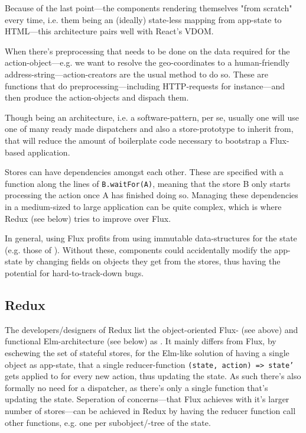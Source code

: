 Because of the last point---the components rendering themselves "from scratch" every time, i.e. them being an (ideally) state-less mapping from app-state to HTML---this architecture pairs well with React's VDOM.

When there's preprocessing that needs to be done on the data required for the action-object---e.g. we want to resolve the geo-coordinates to a human-friendly address-string---action-creators are the usual method to do so. These are functions that do preprocessing---including HTTP-requests for instance---and then produce the action-objects and dispach them. 

Though being an architecture, i.e. a software-pattern,  per se, usually one will use one of many ready made dispatchers and also a store-prototype to inherit from, that will reduce the amount of boilerplate code necessary to bootstrap a Flux-based application.

Stores can have dependencies amongst each other. These are specified with a function along the lines of \texttt{B.waitFor(A)}, meaning that the store B only starts processing the action once A has finished doing so. Managing these dependencies in a medium-sized to large application can be quite complex, which is where Redux (see below) tries to improve over Flux.

In general, using Flux profits from using immutable data-structures for the state (e.g. those of ). Without these, components could accidentally modify the app-state by changing fields on objects they get from the stores, thus having the potential for hard-to-track-down bugs.
 

\subsection{Redux}\label{ref:redux}

The developers/designers of Redux list the object-oriented Flux- (see above) and functional Elm-architecture (see below) as . It mainly differs from Flux, by eschewing the set of stateful stores, for the Elm-like solution of having a single object as app-state, that a single reducer-function \texttt{(state, action) => state'} gets applied to for every new action, thus updating the state. As such there's also formally no need for a
dispatcher, as there's only a single function that's updating the state. Seperation of concerns---that Flux achieves with it's larger number of stores---can be achieved in Redux by having the reducer function call other functions, e.g. one per subobject/-tree of the state. 

